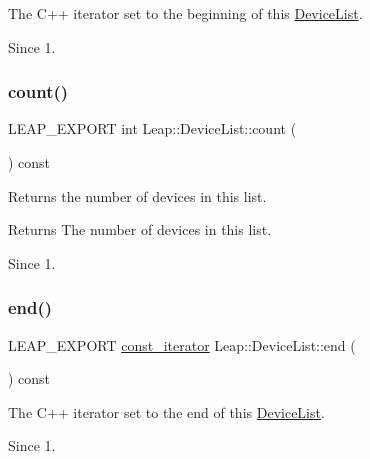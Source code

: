 The C++ iterator set to the beginning of this \hyperlink{class_leap_1_1_device_list}{Device\+List}. \begin{DoxySince}{Since}
1. 
\end{DoxySince}
\mbox{\label{class_leap_1_1_device_list_a2a62cf3b681aef4342d3f5fe309a7d61}} 
\subsubsection{\texorpdfstring{count()}{count()}}
{\footnotesize\ttfamily L\+E\+A\+P\+\_\+\+E\+X\+P\+O\+RT int Leap\+::\+Device\+List\+::count (\begin{DoxyParamCaption}{ }\end{DoxyParamCaption}) const}

Returns the number of devices in this list. \begin{DoxyReturn}{Returns}
The number of devices in this list. 
\end{DoxyReturn}
\begin{DoxySince}{Since}
1. 
\end{DoxySince}
\mbox{\label{class_leap_1_1_device_list_aa725ececd31b45086dde456b810c178d}} 
\subsubsection{\texorpdfstring{end()}{end()}}
{\footnotesize\ttfamily L\+E\+A\+P\+\_\+\+E\+X\+P\+O\+RT \hyperlink{class_leap_1_1_device_list_acfe5b07cda502759bf8fe768e8c6ba87}{const\+\_\+iterator} Leap\+::\+Device\+List\+::end (\begin{DoxyParamCaption}{ }\end{DoxyParamCaption}) const}

The C++ iterator set to the end of this \hyperlink{class_leap_1_1_device_list}{Device\+List}. \begin{DoxySince}{Since}
1. 
\end{DoxySince}
\mbox{\label{class_leap_1_1_device_list_a6dd3954b95415db108f1afcc4fba0041}} 
